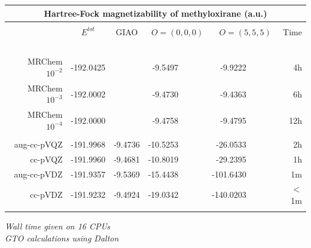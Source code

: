 \begin{frame}
\begin{table}
\centering
\begin{tabular}{r|c|crrr}
\multicolumn{6}{c}{\textbf{Hartree-Fock magnetizability of methyloxirane (a.u.)}}\\
\hline
\hline
                     &               &               &                     &                     &               \\
                     &$E^{tot}$      & GIAO          & $O=(0,0,0)$         & $O=(5,5,5)$         &Time           \\
    \hspace{15mm}\   &\hspace{15mm}\ &\hspace{15mm}\ &\hspace{15mm}\       &\hspace{15mm}\       &\hspace{05mm}\ \\
    MRChem $10^{-2}$ & -192.0425     &               &  -9.5497\ \ \ \ \ \ &  -9.9222\ \ \ \ \ \ &    4h         \\
    MRChem $10^{-3}$ & -192.0002     &               &  -9.4730\ \ \ \ \ \ &  -9.4363\ \ \ \ \ \ &    6h         \\
    MRChem $10^{-4}$ & -192.0000     &               &  -9.4758\ \ \ \ \ \ &  -9.4795\ \ \ \ \ \ &   12h         \\
                     &               &               &                     &                     &               \\
    aug-cc-pVQZ      & -191.9968     & -9.4736       & -10.5253\ \ \ \ \ \ & -26.0533\ \ \ \ \ \ &    2h         \\
	cc-pVQZ      & -191.9960     & -9.4681       & -10.8019\ \ \ \ \ \ & -29.2395\ \ \ \ \ \ &    1h         \\
    aug-cc-pVDZ      & -191.9357     & -9.5369       & -15.4438\ \ \ \ \ \ &-101.6430\ \ \ \ \ \ &    1m         \\
	cc-pVDZ      & -191.9232     & -9.4924       & -19.0342\ \ \ \ \ \ &-140.0203\ \ \ \ \ \ &    $<$1m      \\
                     &               &               &                     &                     &               \\
\hline
\hline
\end{tabular}
\end{table}

\centering
\it{Wall time given on 16 CPUs}\\
\it{GTO calculations using Dalton}

\end{frame}


